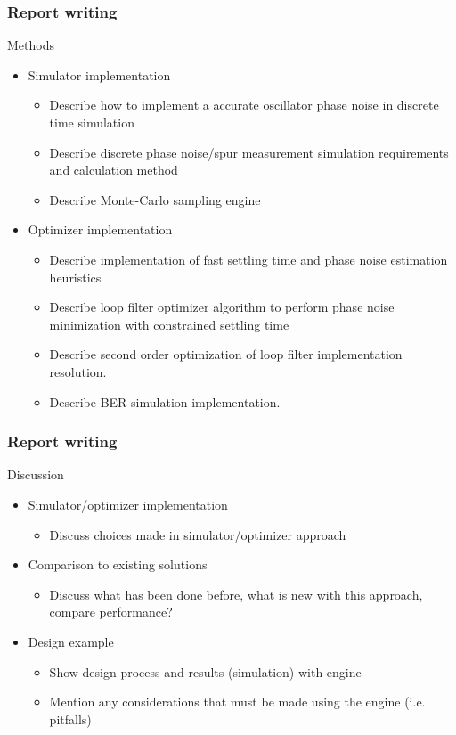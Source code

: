 \documentclass[t, screen, aspectratio=43]{beamer}
\begin{document}
\begin{frame}
	\frametitle{Report writing}
	\begin{block}{Methods}
		\begin{itemize}
			\scriptsize
			\item Simulator implementation
			\begin{itemize}
				\scriptsize
				\item Describe how to implement a accurate oscillator phase noise in discrete time simulation
				\item Describe discrete phase noise/spur measurement simulation requirements and calculation method
				\item Describe Monte-Carlo sampling engine
			\end{itemize}
			\item Optimizer implementation
			\begin{itemize}
				\scriptsize
				\item Describe implementation of fast settling time and phase noise estimation heuristics
				\item Describe loop filter optimizer algorithm to perform phase noise minimization with constrained settling time
				\item Describe second order optimization of loop filter implementation resolution.
				\item Describe BER simulation implementation.
			\end{itemize}
		\end{itemize}    
	\end{block}
\end{frame}

\begin{frame}
	\frametitle{Report writing}
	\begin{block}{Discussion}
		\begin{itemize}
			\scriptsize
			\item Simulator/optimizer implementation
			\begin{itemize}
				\scriptsize
				\item Discuss choices made in simulator/optimizer approach
			\end{itemize}
			\item Comparison to existing solutions
			\begin{itemize}
				\scriptsize
				\item Discuss what has been done before, what is new with this approach, compare performance?
			\end{itemize}
			\item Design example
			\begin{itemize}
				\scriptsize
				\item Show design process and results (simulation) with engine
				\item Mention any considerations that must be made using the engine (i.e. pitfalls)
			\end{itemize}
		\end{itemize}    
	\end{block}
\end{frame}
\end{document}
